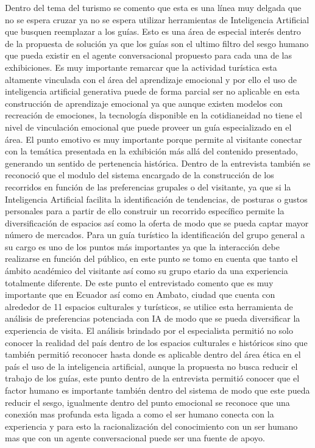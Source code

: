 \documentclass[pdflatex,sn-mathphys-num]{sn-jnl}%
\theoremstyle{thmstyleone}%
\theoremstyle{thmstyletwo}%
\theoremstyle{thmstylethree}%
\begin{document}
Dentro del tema del turismo se comento que esta es una línea muy delgada que no se espera cruzar ya no se espera utilizar herramientas de Inteligencia Artificial que busquen reemplazar a los guías. Esto es una área de especial interés dentro de la propuesta de solución ya que los guías son el ultimo filtro del sesgo humano que pueda existir en el agente conversacional propuesto para cada una de las exhibiciones.
Es muy importante remarcar que la actividad turística esta altamente vinculada con el área del aprendizaje emocional y por ello el uso de inteligencia artificial generativa puede de forma parcial ser no aplicable en esta construcción de aprendizaje emocional ya que aunque existen modelos con recreación de emociones, la tecnología disponible en la cotidianeidad no tiene el nivel de vinculación emocional que puede proveer un guía especializado en el área. El punto emotivo es muy importante porque permite al visitante conectar con la temática presentada en la exhibición más allá del contenido presentado, generando un sentido de pertenencia histórica.
Dentro de la entrevista también se reconoció que el modulo del sistema encargado de la construcción de los recorridos en función de las preferencias grupales o del visitante, ya que si la Inteligencia Artificial facilita la identificación de tendencias, de posturas o gustos personales para a partir de ello construir un recorrido específico permite la diversificación de espacios así como la oferta de modo que se pueda captar mayor número de mercados.
Para un guía turístico la identificación del grupo general a su cargo es uno de los puntos más importantes ya que la interacción debe realizarse en función del público, en este punto se tomo en cuenta que tanto el ámbito académico del visitante así como su grupo etario da una experiencia totalmente diferente. De este punto el entrevistado comento que es muy importante que en Ecuador así como en Ambato, ciudad que cuenta con alrededor de 11 espacios culturales y turísticos, se utilice esta herramienta de análisis de preferencias potenciada con IA de modo que se pueda diversificar la experiencia de visita.
El análisis brindado por el especialista permitió no solo conocer la realidad del país dentro de los espacios culturales e históricos sino que también permitió reconocer hasta donde es aplicable dentro del área ética en el país el uso de la inteligencia artificial, aunque la propuesta no busca reducir el trabajo de los guías, este punto dentro de la entrevista permitió conocer que el factor humano es importante también dentro del sistema de modo que este pueda reducir el sesgo, igualmente dentro del punto emocional se reconoce que una conexión mas profunda esta ligada a como el ser humano conecta con la experiencia y para esto la racionalización del conocimiento con un ser humano mas que con un agente conversacional puede ser una fuente de apoyo.
\end{document}

